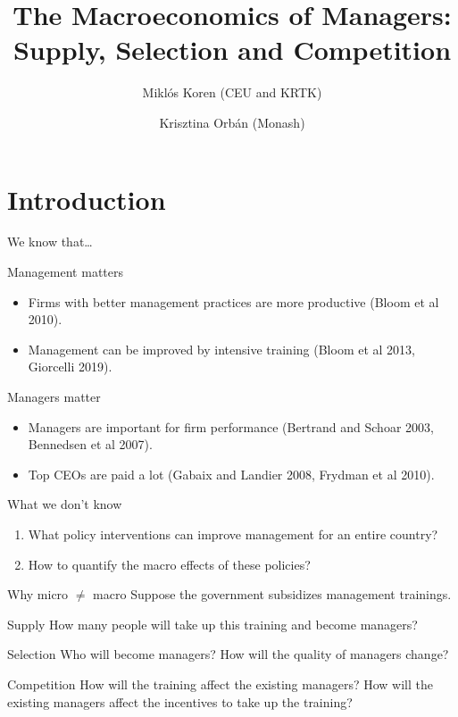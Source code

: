 \documentclass[
  ignorenonframetext,
  aspectratio=1610,
]{beamer}
\title{The Macroeconomics of Managers: Supply, Selection and
Competition}
\author{Miklós Koren (CEU and KRTK) \and Krisztina Orbán (Monash)}
\date{October 25, 2023\footnote<.->{Supported by Élvonal grant of NKFIH
  (grant no. 144193)}}
\providecommand{\tightlist}{%
  \setlength{\itemsep}{0pt}\setlength{\parskip}{0pt}}
\begin{document}
\frame{\titlepage}

\section{Introduction}\label{introduction}

\begin{frame}{We know that\ldots{}}
\protect\hypertarget{we-know-that}{}
\begin{block}{Management matters}
\protect\hypertarget{management-matters}{}
\begin{itemize}
\tightlist
\item
  Firms with better management practices are more productive (Bloom et
  al 2010).
\item
  Management can be improved by intensive training (Bloom et al 2013,
  Giorcelli 2019).
\end{itemize}
\end{block}

\begin{block}{Managers matter}
\protect\hypertarget{managers-matter}{}
\begin{itemize}
\tightlist
\item
  Managers are important for firm performance (Bertrand and Schoar 2003,
  Bennedsen et al 2007).
\item
  Top CEOs are paid a lot (Gabaix and Landier 2008, Frydman et al 2010).
\end{itemize}
\end{block}
\end{frame}

\begin{frame}{What we don't know}
\protect\hypertarget{what-we-dont-know}{}
\begin{enumerate}
\tightlist
\item
  What policy interventions can improve management for an entire
  country?
\item
  How to quantify the macro effects of these policies?
\end{enumerate}
\end{frame}

\begin{frame}{Why micro \(\neq\) macro}
\protect\hypertarget{why-micro-neq-macro}{}
Suppose the government subsidizes management trainings.

\begin{block}{Supply}
\protect\hypertarget{supply}{}
How many people will take up this training and become managers?
\end{block}

\begin{block}{Selection}
\protect\hypertarget{selection}{}
Who will become managers? How will the quality of managers change?
\end{block}

\begin{block}{Competition}
\protect\hypertarget{competition}{}
How will the training affect the existing managers? How will the
existing managers affect the incentives to take up the training?
\end{block}
\end{frame}
\end{document}
